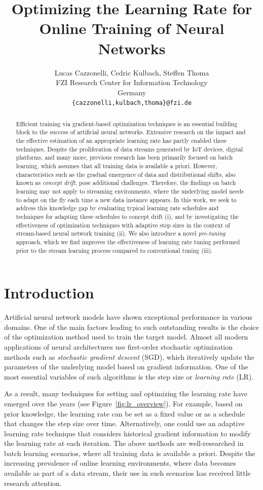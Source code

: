\documentclass{article} %
\title{Optimizing the Learning Rate for Online Training of Neural Networks}
\author{Lucas Cazzonelli, Cedric Kulbach, Steffen Thoma\\
FZI Research Center for Information Technology\\
Germany \\
\texttt{\{cazzonelli,kulbach,thoma\}@fzi.de} \\
}
\begin{document}
\maketitle

\begin{abstract}
   Efficient training via gradient-based optimization techniques is an essential building block to the success of artificial neural networks. Extensive research on the impact and the effective estimation of an appropriate learning rate has partly enabled these techniques. Despite the proliferation of data streams generated by IoT devices, digital platforms, and many more, previous research has been primarily focused on batch learning, which assumes that all training data is available a priori. However, characteristics such as the gradual emergence of data and distributional shifts, also known as \textit{concept drift}, pose additional challenges. Therefore, the findings on batch learning may not apply to streaming environments, where the underlying model needs to adapt on the fly each time a new data instance appears. In this work, we seek to address this knowledge gap by evaluating typical learning rate schedules and techniques for adapting these schedules to concept drift (i), and by investigating the effectiveness of  optimization techniques with adaptive step sizes in the context of stream-based neural network training (ii). We also introduce a novel \textit{pre-tuning} approach, which we find improves the effectiveness of learning rate tuning performed prior to the stream learning process compared to conventional tuning (iii).
\end{abstract}

\section{Introduction}
Artificial neural network models have shown exceptional performance in various domains.
One of the main factors leading to such outstanding results is the choice of the optimization method used to train the target model.
Almost all modern applications of neural architectures use first-order stochastic optimization methods such as \textit{stochastic gradient descent} (SGD), which iteratively update the parameters of the underlying model based on gradient information.
One of the most essential variables of such algorithms is the step size or \textit{learning rate} (LR).

As a result, many techniques for setting and optimizing the learning rate have emerged over the years (see Figure~\ref{fig:lr_overview}).
For example, based on prior knowledge, the learning rate can be set as a fixed value or as a schedule that changes the step size over time.
Alternatively, one could use an adaptive learning rate technique that considers historical gradient information to modify the learning rate at each iteration.
The above methods are well-researched in batch learning scenarios, where all training data is available a priori.
Despite the increasing prevalence of online learning environments, where data becomes available as part of a data stream, their use in such scenarios has received little research attention.
\end{document}
